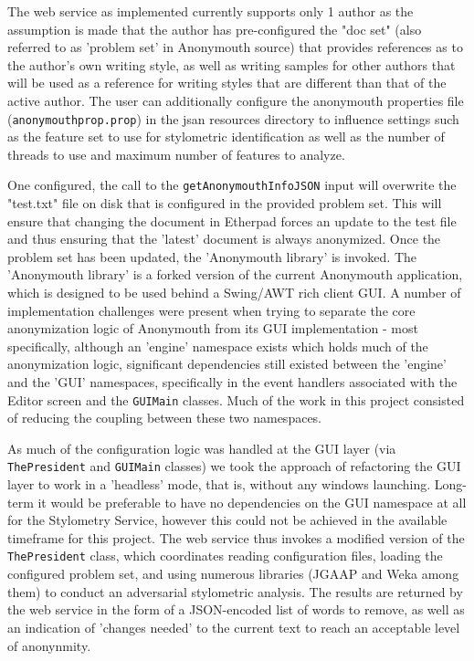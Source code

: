 \documentclass[letterpaper]{article}
\begin{document}
The web service as implemented currently supports only 1 author as the
assumption is made that the author has pre-configured the "doc set"
(also referred to as 'problem set' in Anonymouth source) that provides
references as to the author's own writing style, as well as writing
samples for other authors that will be used as a reference for writing
styles that are different than that of the active author. The user can
additionally configure the anonymouth properties file
(\texttt{anonymouthprop.prop}) in the jsan resources directory to influence
settings such as the feature set to use for stylometric identification
as well as the number of threads to use and maximum number of features
to analyze.

One configured, the call to the \texttt{getAnonymouthInfoJSON} input
will overwrite the "test.txt" file on disk that is configured in the
provided problem set. This will ensure that changing the document in
Etherpad forces an update to the test file and thus ensuring that the
'latest' document is always anonymized. Once the problem set has been
updated, the 'Anonymouth library' is invoked. The 'Anonymouth library'
is a forked version of the current Anonymouth application, which is
designed to be used behind a Swing/AWT rich client GUI. A number of
implementation challenges were present when trying to separate the
core anonymization logic of Anonymouth from its GUI implementation -
most specifically, although an 'engine' namespace exists which holds
much of the anonymization logic, significant dependencies still
existed between the 'engine' and the 'GUI' namespaces, specifically in
the event handlers associated with the Editor screen and the
\texttt{GUIMain} classes. Much of the work in this project consisted
of reducing the coupling between these two namespaces.

As much of the configuration logic was handled at the GUI layer (via
\texttt{ThePresident} and \texttt{GUIMain} classes) we took the
approach of refactoring the GUI layer to work in a 'headless' mode,
that is, without any windows launching. Long-term it would be
preferable to have no dependencies on the GUI namespace at all for the
Stylometry Service, however this could not be achieved in the
available timeframe for this project. The web service thus invokes a
modified version of the \texttt{ThePresident} class, which coordinates
reading configuration files, loading the configured problem set, and
using numerous libraries (JGAAP and Weka among them) to conduct an
adversarial stylometric analysis. The results are returned by the web
service in the form of a JSON-encoded list of words to remove, as well
as an indication of 'changes needed' to the current text to reach an
acceptable level of anonynmity.
\end{document}
